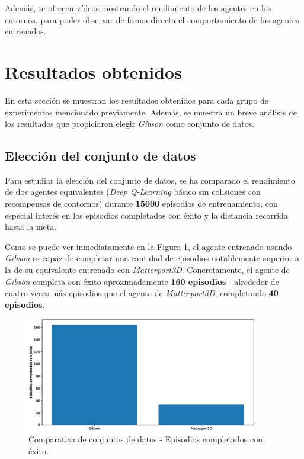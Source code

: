 Además, se ofrecen vídeos mostrando el rendimiento de los agentes en los entornos, para poder observar de forma directa el comportamiento de los agentes entrenados.

\section{Resultados obtenidos}

En esta sección se muestran los resultados obtenidos para cada grupo de experimentos mencionado previamente. Además, se muestra un breve análisis de los resultados que propiciaron elegir \textit{Gibson} como conjunto de datos.

\subsection{Elección del conjunto de datos}

Para estudiar la elección del conjunto de datos, se ha comparado el rendimiento de dos agentes equivalentes (\textit{Deep Q-Learning} básico sin colisiones con recompensas de contornos) durante \textbf{15000} episodios de entrenamiento, con especial interés en los episodios completados con éxito y la distancia recorrida hasta la meta.

Como se puede ver inmediatamente en la Figura \ref{fig:chap6-dataset-success}, el agente entrenado usando \textit{Gibson} es capaz de completar una cantidad de episodios notablemente superior a la de su equivalente entrenado con \textit{Matterport3D}. Concretamente, el agente de \textit{Gibson} completa con éxito aproximadamente \textbf{160 episodios} - alrededor de cuatro veces más episodios que el agente de \textit{Matterport3D}, completando \textbf{40 episodios}.

\begin{figure}[h]
    \centering
    \includegraphics[width=0.9\textwidth]{imagenes/cap6/dataset/success.eps}
    \caption{Comparativa de conjuntos de datos - Episodios completados con éxito.}
    \label{fig:chap6-dataset-success}
\end{figure}

